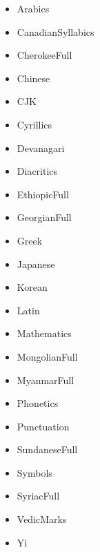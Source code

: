 \documentclass{article}
\newenvironment{itemlist}{%
  \begin{itemize}
  \setlength{\itemsep}{0pt}
  \setlength{\parsep}{0pt}
  \setlength{\topsep}{0pt}
  \setlength{\partopsep}{0pt}
  \setlength{\parskip}{0pt}
  \setlength{\labelsep}{5pt}}%
{
  \end{itemize}}
\begin{document}
    \begin{multicols*}{2}
      \begin{itemlist}
        \item Arabics
        \item CanadianSyllabics
        \item CherokeeFull
        \item Chinese
        \item CJK
        \item Cyrillics
        \item Devanagari
        \item Diacritics
        \item EthiopicFull
        \item GeorgianFull
        \item Greek
        \item Japanese
        \item Korean
        \item Latin
        \item Mathematics
        \item MongolianFull
        \item MyanmarFull
        \item Phonetics
        \item Punctuation
        \item SundaneseFull
        \item Symbols
        \item SyriacFull
        \item VedicMarks
        \item Yi
      \end{itemlist}
    \end{multicols*}
\end{document}
